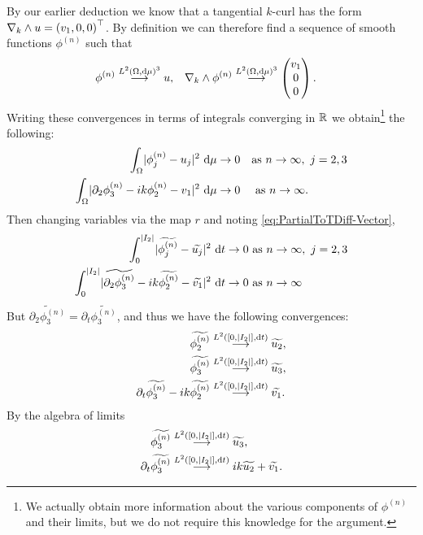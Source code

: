 By our earlier deduction we know that a tangential $k$-curl has the form $\nabla_{k}\wedge u=\left( v_1,0,0 \right)^{\top}$.
By definition we can therefore find a sequence of smooth functions $\phi^{(n)}$ such that 
\begin{align*}
	\phi^{(n)} \overset{L^{2}\left( \Omega,\mathrm{d}\mu \right)^3}{\longrightarrow} u,
	&\quad \nabla_{k}\wedge\phi^{(n)} \overset{L^{2}\left( \Omega,\mathrm{d}\mu \right)^3}{\longrightarrow} \begin{pmatrix} v_1 \\ 0 \\ 0 \end{pmatrix}.
\end{align*}
Writing these convergences in terms of integrals converging in $\mathbb{R}$ we obtain\footnote{We actually obtain more information about the various components of $\phi^{(n)}$ and their limits, but we do not require this knowledge for the argument.} the following:
\begin{align*}
	\int_{\Omega}\lvert \phi_j^{(n)}-u_j \rvert^2 \ \mathrm{d}\mu &\rightarrow 0 \quad\text{as} \ n\rightarrow\infty, \ j=2,3\\
	\int_{\Omega}\lvert \partial_2\phi_3^{(n)}-ik\phi_2^{(n)}-v_1 \rvert^2 \ \mathrm{d}\mu &\rightarrow 0 \quad \ \text{as} \ n \rightarrow\infty.
\end{align*}
Then changing variables via the map $r$ and noting \eqref{eq:PartialToTDiff-Vector},
\begin{align*}
	\int_0^{\lvert I_2 \rvert}\lvert \widetilde{\phi_j^{(n)}}-\widetilde{u_j} \rvert^2 \ \mathrm{d} t \rightarrow 0 &\ \text{as} \ n \rightarrow\infty, \ j =2,3 \\
	\int_0^{\lvert I_2 \rvert}\lvert \widetilde{\partial_2\phi_3^{(n)}}-ik\widetilde{\phi_2^{(n)}}-\widetilde{v_1} \rvert^2 \ \mathrm{d} t \rightarrow0 &\ \text{as} \ n \rightarrow\infty
\end{align*}
But $\widetilde{\partial_2\phi_3^{(n)}} = \partial_t\widetilde{\phi_3^{(n)}}$, and thus we have the following convergences:
\begin{align*}
	\widetilde{\phi_2^{(n)}} &\overset{L^{2}\left( \left[ 0,\lvert I_2 \rvert \right],\mathrm{d}t \right)}{\longrightarrow} \widetilde{u_2}, \\
	\widetilde{\phi_3^{(n)}} &\overset{L^{2}\left( \left[ 0,\lvert I_2 \rvert \right],\mathrm{d}t \right)}{\longrightarrow} \widetilde{u_3}, \\
	\partial_t\widetilde{\phi_3^{(n)}}-ik\widetilde{\phi_2^{(n)}} &\overset{L^{2}\left( \left[ 0,\lvert I_2 \rvert \right],\mathrm{d}t \right)}{\longrightarrow} \widetilde{v_1}.
\end{align*}
By the algebra of limits
\begin{align*}
	\widetilde{\phi_3^{(n)}} &\overset{L^{2}\left( \left[ 0,\lvert I_2 \rvert \right],\mathrm{d}t \right)}{\longrightarrow} \widetilde{u_3}, \\
	\partial_t\widetilde{\phi_3^{(n)}} &\overset{L^{2}\left( \left[ 0,\lvert I_2 \rvert \right],\mathrm{d}t \right)}{\longrightarrow} ik\widetilde{u_2} + \widetilde{v_1}.
\end{align*}
